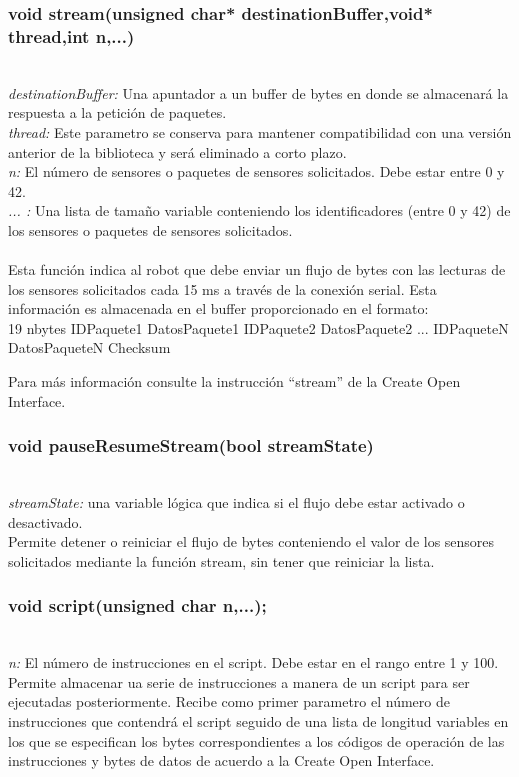 \documentclass[letterpaper]{book}
\begin{document}
\subsubsection{void stream(unsigned char* destinationBuffer,void* thread,int n,...)}\mbox{}\\
\emph{destinationBuffer: } Una apuntador a un buffer de bytes en donde se almacenará la respuesta  a la petición de paquetes.\\
\emph{thread: } Este parametro se conserva para mantener compatibilidad con una versión anterior de la biblioteca y será eliminado a corto plazo.\\
\emph{n: } El número de sensores o paquetes de sensores solicitados. Debe estar entre 0 y 42.\\
\emph{... :} Una lista de tamaño variable conteniendo los identificadores (entre 0 y 42) de los sensores o paquetes de sensores solicitados.\\\\

Esta función indica al robot que debe enviar un flujo de bytes con las lecturas de los sensores solicitados cada 15 ms a través de la conexión serial. Esta información es almacenada en el buffer proporcionado en el formato:\\

19 nbytes IDPaquete1 DatosPaquete1 IDPaquete2 DatosPaquete2 ... IDPaqueteN DatosPaqueteN Checksum

Para más información consulte la instrucción ``stream'' de la Create Open Interface.\\

\subsubsection{void pauseResumeStream(bool streamState)}\mbox{}\\
\emph{streamState: } una variable lógica que indica si el flujo debe estar activado o desactivado.\\
Permite detener o reiniciar el flujo de bytes conteniendo el valor de los sensores solicitados mediante la función stream, sin tener que reiniciar la lista.\\
\subsubsection{void script(unsigned char n,...);}\mbox{}\\
\emph{n: }El número de instrucciones en el script. Debe estar en el rango entre 1 y 100.\\
Permite almacenar ua serie de instrucciones a manera de un script para ser ejecutadas posteriormente. Recibe como primer parametro el número de instrucciones que contendrá el script seguido de una lista de longitud variables en los que se especifican los bytes correspondientes a los códigos de operación de las instrucciones y bytes de datos de acuerdo a la Create Open Interface.\\
\end{document}
